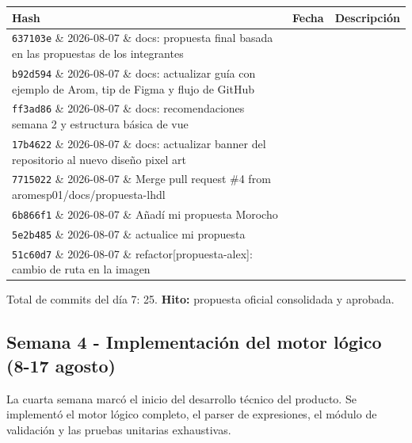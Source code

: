 \documentclass[11pt,a4paper]{article}
\begin{document}
\begin{table}[htbp]
\centering
\small
\begin{tabularx}{\textwidth}{llX}
\toprule
\textbf{Hash} & \textbf{Fecha} & \textbf{Descripción} \\
\midrule
\texttt{637103e} \& 2026-08-07 \& docs: propuesta final basada en las propuestas de los integrantes \\
\texttt{b92d594} \& 2026-08-07 \& docs: actualizar guía con ejemplo de Arom, tip de Figma y flujo de GitHub \\
\texttt{ff3ad86} \& 2026-08-07 \& docs: recomendaciones semana 2 y estructura básica de vue \\
\texttt{17b4622} \& 2026-08-07 \& docs: actualizar banner del repositorio al nuevo diseño pixel art \\
\texttt{7715022} \& 2026-08-07 \& Merge pull request \#4 from aromesp01/docs/propuesta-lhdl \\
\texttt{6b866f1} \& 2026-08-07 \& Añadí mi propuesta Morocho \\
\texttt{5e2b485} \& 2026-08-07 \& actualice mi propuesta \\
\texttt{51c60d7} \& 2026-08-07 \& refactor[propuesta-alex]: cambio de ruta en la imagen \\
\bottomrule
\end{tabularx}
\end{table}
Total de commits del día 7: 25. \textbf{Hito:} propuesta oficial consolidada y aprobada.

\subsection{Semana 4 - Implementación del motor lógico (8-17 agosto)}
La cuarta semana marcó el inicio del desarrollo técnico del producto. Se implementó el motor lógico completo, el parser de expresiones, el módulo de validación y las pruebas unitarias exhaustivas.
\end{document}

